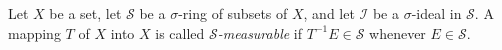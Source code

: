 Let $X$ be a set, let $\mathcal{S}$ be a $\sigma$-ring of subsets of $X$, and let $\mathcal{I}$ be a $\sigma$-ideal in $\mathcal{S}$. A mapping $T$ of $X$ into $X$ is called \textit{$\mathcal{S}$-measurable} if $T^{-1}E \in \mathcal{S}$ whenever $E \in \mathcal{S}$.
